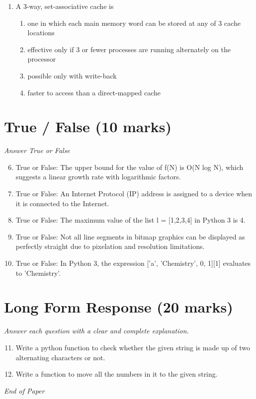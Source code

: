 \documentclass[12pt]{article}
\begin{document}
\begin{enumerate}[label=\arabic*.]
\begin{enumerate}[label=(\alph*)]
\end{enumerate}
\item A 3-way, set-associative cache is
\begin{enumerate}[label=(\alph*)]
    \item one in which each main memory word can be stored at any of 3 cache locations
    \item effective only if 3 or fewer processes are running alternately on the processor
    \item possible only with write-back
    \item faster to access than a direct-mapped cache
\end{enumerate}
\end{enumerate}

\section*{True / False (10 marks)}
\textit{Answer True or False}
\begin{enumerate}[label=\arabic*.]
\setcounter{enumi}{5}
\item True or False: The upper bound for the value of f(N) is O(N log N), which suggests a linear growth rate with logarithmic factors.
\item True or False: An Internet Protocol (IP) address is assigned to a device when it is connected to the Internet.
\item True or False: The maximum value of the list l = [1,2,3,4] in Python 3 is 4.
\item True or False: Not all line segments in bitmap graphics can be displayed as perfectly straight due to pixelation and resolution limitations.
\item True or False: In Python 3, the expression ['a', 'Chemistry', 0, 1][1] evaluates to 'Chemistry'.
\end{enumerate}

\section*{Long Form Response (20 marks)}
\textit{Answer each question with a clear and complete explanation.}
\begin{enumerate}[label=\arabic*.]
\setcounter{enumi}{10}
\item Write a python function to check whether the given string is made up of two alternating characters or not.
\item Write a function to move all the numbers in it to the given string.
\end{enumerate}

\vfill
\noindent\textit{End of Paper}
\end{document}
